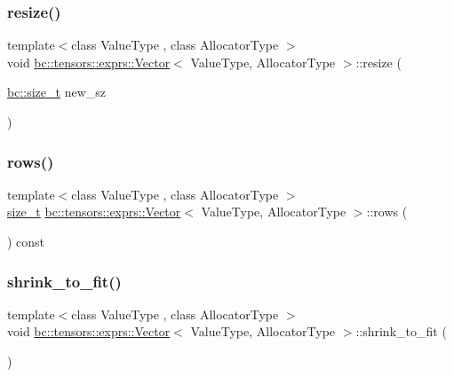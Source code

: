 \subsubsection{\texorpdfstring{resize()}{resize()}}
{\footnotesize\ttfamily template$<$class Value\+Type , class Allocator\+Type $>$ \\
void \hyperlink{structbc_1_1tensors_1_1exprs_1_1Vector}{bc\+::tensors\+::exprs\+::\+Vector}$<$ Value\+Type, Allocator\+Type $>$\+::resize (\begin{DoxyParamCaption}\item[{\hyperlink{namespacebc_aaf8e3fbf99b04b1b57c4f80c6f55d3c5}{bc\+::size\+\_\+t}}]{new\+\_\+sz }\end{DoxyParamCaption})\hspace{0.3cm}{\ttfamily [inline]}}

\mbox{\label{structbc_1_1tensors_1_1exprs_1_1Vector_a33681a7db833cc8dd96cc286d6732b4e}} 
\subsubsection{\texorpdfstring{rows()}{rows()}}
{\footnotesize\ttfamily template$<$class Value\+Type , class Allocator\+Type $>$ \\
\hyperlink{namespacebc_aaf8e3fbf99b04b1b57c4f80c6f55d3c5}{size\+\_\+t} \hyperlink{structbc_1_1tensors_1_1exprs_1_1Vector}{bc\+::tensors\+::exprs\+::\+Vector}$<$ Value\+Type, Allocator\+Type $>$\+::rows (\begin{DoxyParamCaption}{ }\end{DoxyParamCaption}) const\hspace{0.3cm}{\ttfamily [inline]}}

\mbox{\label{structbc_1_1tensors_1_1exprs_1_1Vector_a5858c21a9567c5417e70ac58f5e4bef8}} 
\subsubsection{\texorpdfstring{shrink\+\_\+to\+\_\+fit()}{shrink\_to\_fit()}}
{\footnotesize\ttfamily template$<$class Value\+Type , class Allocator\+Type $>$ \\
void \hyperlink{structbc_1_1tensors_1_1exprs_1_1Vector}{bc\+::tensors\+::exprs\+::\+Vector}$<$ Value\+Type, Allocator\+Type $>$\+::shrink\+\_\+to\+\_\+fit (\begin{DoxyParamCaption}{ }\end{DoxyParamCaption})\hspace{0.3cm}{\ttfamily [inline]}}

